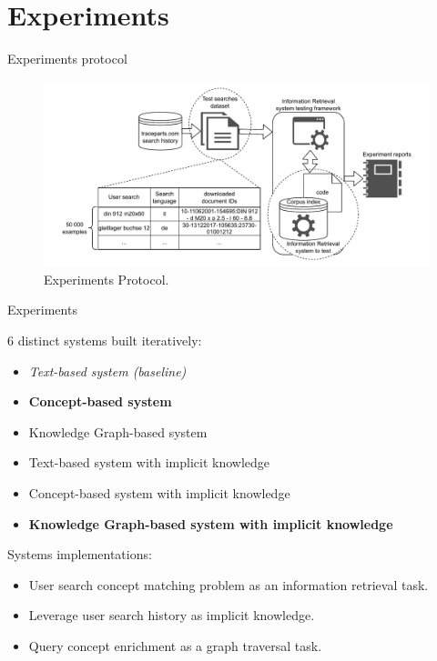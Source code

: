 \section{Experiments}

\begin{frame}{Experiments protocol}

    \begin{figure} [H]
        \begin{center}
            \includegraphics[scale=0.55]{images/tp-search-expe-setting.pdf} 
            \caption{Experiments Protocol.} 
        \end{center}
    \end{figure}

\end{frame}

\begin{frame}{Experiments}

    6 distinct systems built iteratively:
    \begin{itemize}
        \item \emph{Text-based system (baseline)}
        \item \textbf{Concept-based system}
        \item Knowledge Graph-based system
        \item Text-based system with implicit knowledge
        \item Concept-based system with implicit knowledge
        \item \textbf{Knowledge Graph-based system with implicit knowledge}
    \end{itemize}
    
    Systems implementations:
    \begin{itemize}
        \item User search concept matching problem as an information retrieval task.
        \item Leverage user search history as implicit knowledge.
        \item Query concept enrichment as a graph traversal task.
    \end{itemize}

\end{frame}

